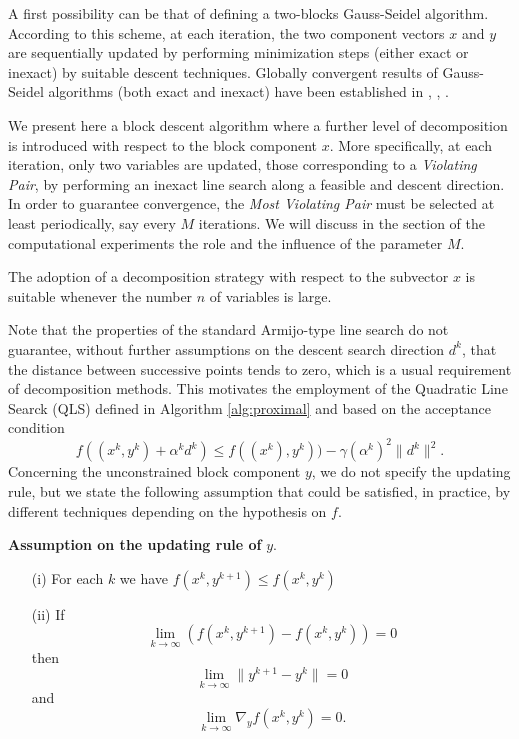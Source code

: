 A first possibility can be that of defining a two-blocks Gauss-Seidel algorithm.
According to this scheme, at each iteration, the two component vectors $x$ and $y$ are
sequentially updated by performing  minimization steps (either exact or inexact) by  suitable descent techniques.
Globally convergent results of Gauss-Seidel algorithms (both exact and inexact) have been established in \cite{}, \cite{}, \cite{}.

We present here a block descent algorithm where a further level of decomposition is
introduced with respect to the block component $x$. 
More specifically, at each iteration, only two variables are updated, those corresponding
to a {\it Violating Pair}, by performing an inexact line search along a feasible and descent direction.
In order to guarantee convergence, the {\it Most Violating Pair} must be selected at least periodically, say every $M$ iterations.
We will discuss in the section of the computational experiments the role and the influence of the parameter $M$.

The adoption of a decomposition strategy with respect to the subvector $x$ is suitable
whenever the number $n$ of variables is large.

Note that the properties of the standard Armijo-type line search do not guarantee, without further assumptions
on the descent search direction $d^k$, that the distance between successive points tends to zero, which is a usual requirement of decomposition methods. 
This motivates the employment of the Quadratic Line Searck (QLS) defined in Algorithm \ref{alg:proximal} and based on the acceptance condition
$$
f((x^k,y^k)+\alpha^kd^k)\le f((x^k),y^k))-\gamma (\alpha^k)^2\|d^k\|^2.
$$
Concerning the unconstrained block component $y$, we do not specify the updating rule, but we state the following assumption that
could be satisfied, in practice, by different techniques depending on the hypothesis on $f$.
\par\medskip\noindent
{\bf Assumption on the updating rule of} $y$.
\par\medskip\noindent
\begin{itemize}
\item[(i)] For each $k$ we have $f(x^k,y^{k+1})\le f(x^k,y^k)$
\item [(ii)] If
$$
\lim_{k\to\infty} \left(f(x^k,y^{k+1})- f(x^k,y^k)\right)=0
$$
then
$$
\lim_{k\to\infty}\|y^{k+1}-y^k\|=0
$$
and
$$
\lim_{k\to\infty}\nabla_y f(x^k,y^k)=0.
$$
\end{itemize}


